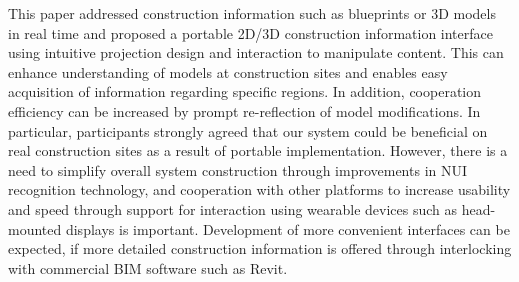 This paper addressed construction information such as blueprints or 3D models in real time and proposed a portable 2D/3D construction information interface using intuitive projection design and interaction to manipulate content. This can enhance understanding of models at construction sites and enables easy acquisition of information regarding specific regions. In addition, cooperation efficiency can be increased by prompt re-reflection of model modifications. In particular, participants strongly agreed that our system could be beneficial on real construction sites as a result of portable implementation. However, there is a need to simplify overall system construction through improvements in NUI recognition technology, and cooperation with other platforms to increase usability and speed through support for interaction using wearable devices such as head-mounted displays is important. Development of more convenient interfaces can be expected, if more detailed construction information is offered through interlocking with commercial BIM software such as Revit.
